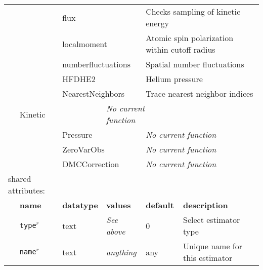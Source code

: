 \begin{table}[h]
\begin{center}
\begin{tabularx}{\textwidth}{l l l l l l }
\multicolumn{2}{l}{                } & \multicolumn{2}{l}{flux              } & \multicolumn{2}{l}{Checks sampling of kinetic energy}\\
\multicolumn{2}{l}{                } & \multicolumn{2}{l}{localmoment       } & \multicolumn{2}{l}{Atomic spin polarization within cutoff radius}\\
\multicolumn{2}{l}{                } & \multicolumn{2}{l}{numberfluctuations} & \multicolumn{2}{l}{Spatial number fluctuations}\\
\multicolumn{2}{l}{                } & \multicolumn{2}{l}{HFDHE2            } & \multicolumn{2}{l}{Helium pressure}\\
\multicolumn{2}{l}{                } & \multicolumn{2}{l}{NearestNeighbors  } & \multicolumn{2}{l}{Trace nearest neighbor indices}\\
\dev{
\multicolumn{2}{l}{                } & \multicolumn{2}{l}{Kinetic           } & \multicolumn{2}{l}{\textit{No current function}}\\
\multicolumn{2}{l}{                } & \multicolumn{2}{l}{Pressure          } & \multicolumn{2}{l}{\textit{No current function}}\\
\multicolumn{2}{l}{                } & \multicolumn{2}{l}{ZeroVarObs        } & \multicolumn{2}{l}{\textit{No current function}}\\
\multicolumn{2}{l}{                } & \multicolumn{2}{l}{DMCCorrection     } & \multicolumn{2}{l}{\textit{No current function}}\\
\multicolumn{2}{l}{shared attributes:} & \multicolumn{4}{l}{}\\
}
   &   \bfseries name     & \bfseries datatype & \bfseries values & \bfseries default   & \bfseries description \\
   &   \texttt{type}$^r$      &  text              & \textit{See above}        & 0                   & Select estimator type         \\
   &   \texttt{name}$^r$      &  text              & \textit{anything}         & any                 & Unique name for this estimator\\
\hline
\end{tabularx}
\end{center}
\end{table}
\FloatBarrier



